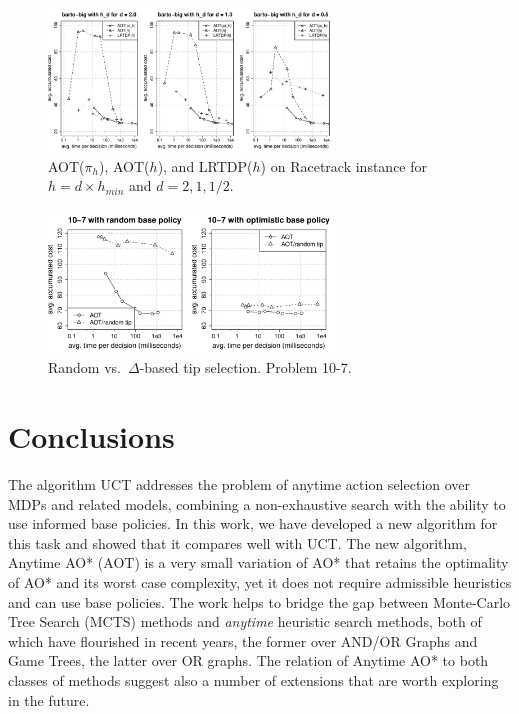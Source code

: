 \documentclass[letterpaper]{article}
\begin{document}
\begin{figure}
\centering
\includegraphics[width=3in,clip=on,trim=.75cm 1cm 1.5cm 1cm]{barto-big-aot-vs-lrtdp-minmin.pdf}
\caption{AOT($\pi_h$), AOT($h$), and LRTDP($h$) on 
   Racetrack instance for $h=d \times h_{min}$ and $d=2,1,1/2$.}
\label{fig:aot_vs_lrtdp:racetrack}
\end{figure}

\begin{figure}
\centering
\includegraphics[width=3in,clip=on,trim=.75cm 1cm 1.5cm 1cm]{ctp_selection_10-7.pdf}
\caption{Random vs.\ $\Delta$-based tip selection. Problem 10-7.}
\label{fig:ctp:selection:10-7}
\end{figure}




\section{Conclusions}

The algorithm UCT addresses the problem of anytime action selection over MDPs and related models,  
combining a  non-exhaustive search with the ability to  use informed base policies. 
In this work, we  have developed a new  algorithm for this task and showed that it compares well with UCT. The new algorithm, Anytime AO* (AOT)
is a very small variation of AO* that retains the optimality of AO* and its worst case  complexity, 
yet it does not require  admissible heuristics and can use base policies. The work
 helps to  bridge the gap between  Monte-Carlo Tree Search (MCTS) methods and \emph{anytime} heuristic search methods,
both of which have flourished in recent years, the former over AND/OR Graphs and Game Trees, the latter
over OR graphs. The relation of Anytime AO* to both classes of methods  suggest also
a number of extensions that are worth exploring in the future. 
\end{document}
